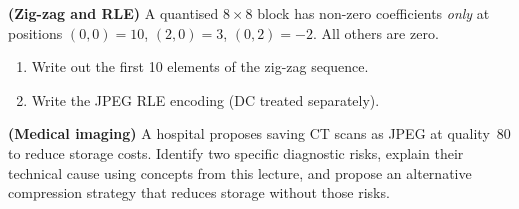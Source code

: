 \begin{exercisebox}
\textbf{(Zig-zag and RLE)} A quantised $8\times8$ block has non-zero coefficients \emph{only} at positions $(0,0)=10$, $(2,0)=3$, $(0,2)=-2$. All others are zero.
\begin{enumerate}[nosep, label=(\alph*)]
  \item Write out the first 10 elements of the zig-zag sequence.
  \item Write the JPEG RLE encoding (DC treated separately).
\end{enumerate}
\end{exercisebox}

\begin{exercisebox}
\textbf{(Medical imaging)} A hospital proposes saving CT scans as JPEG at quality~80 to reduce storage costs. Identify two specific diagnostic risks, explain their technical cause using concepts from this lecture, and propose an alternative compression strategy that reduces storage without those risks.
\end{exercisebox}

\endinput
